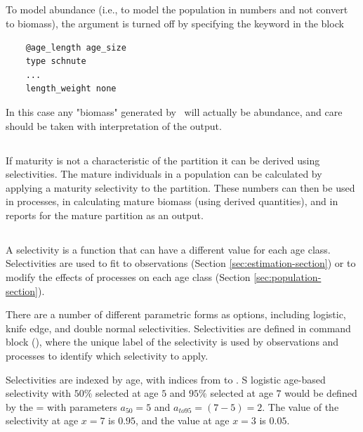 \subsection{\label{sec:weightless-model}}

To model abundance (i.e., to model the population in numbers and not convert to biomass), the  argument is turned off by specifying the keyword  in the  block

{\small{\begin{verbatim}
	@age_length age_size
	type schnute
	...
	length_weight none
	\end{verbatim}}}

In this case any "biomass" generated by \CNAME\ will actually be abundance, and care should be taken with interpretation of the output.

\subsection{\label{sec:maturity-notinpartition}}

If maturity is not a characteristic of the partition it can be derived using selectivities. The mature individuals in a population can be calculated by applying a maturity selectivity to the partition.  These numbers can then be used in processes, in calculating mature biomass (using derived quantities), and in reports for the mature partition as an output.

\subsection{\label{sec:selectivities}}

A selectivity is a function that can have a different value for each age class. Selectivities are used to fit to observations (Section \ref{sec:estimation-section}) or to modify the effects of processes on each age class (Section \ref{sec:population-section}).

There are a number of different parametric forms as options, including logistic, knife edge, and double normal selectivities. Selectivities are defined in command block (), where the unique label of the selectivity is used by observations and processes to identify which selectivity to apply.

Selectivities are indexed by age, with indices from  to . S logistic age-based selectivity with $50\%$ selected at age $5$ and $95\%$ selected at age $7$ would be defined by the = with parameters $a_{50}=5$ and $a_{to95}=(7-5)=2$. The value of the selectivity at age $x=7$ is $0.95$, and the value at age $x=3$ is $0.05$.

